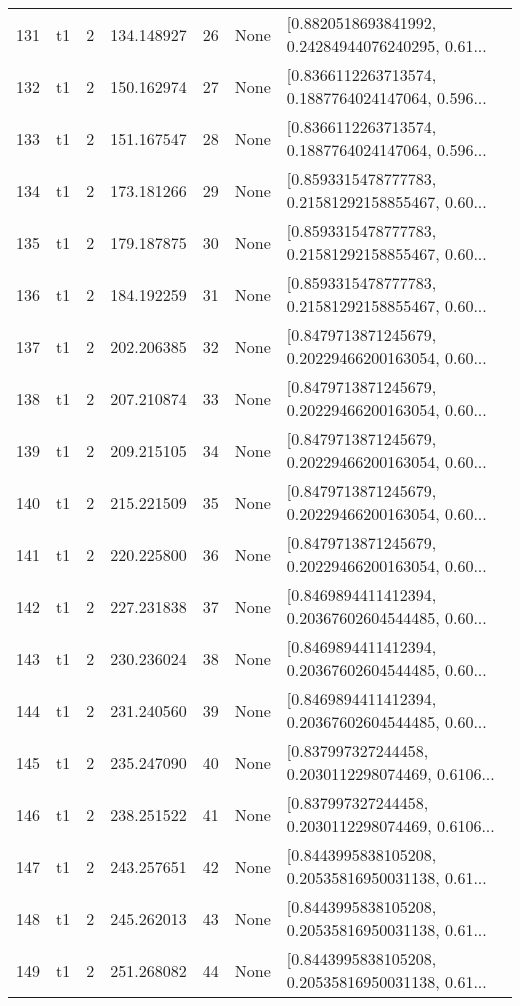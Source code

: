 \begin{tabular}{lllrlll}
131 &  t1 &   2 &  134.148927 &   26 &  None &  [0.8820518693841992, 0.24284944076240295, 0.61... \\
132 &  t1 &   2 &  150.162974 &   27 &  None &  [0.8366112263713574, 0.1887764024147064, 0.596... \\
133 &  t1 &   2 &  151.167547 &   28 &  None &  [0.8366112263713574, 0.1887764024147064, 0.596... \\
134 &  t1 &   2 &  173.181266 &   29 &  None &  [0.8593315478777783, 0.21581292158855467, 0.60... \\
135 &  t1 &   2 &  179.187875 &   30 &  None &  [0.8593315478777783, 0.21581292158855467, 0.60... \\
136 &  t1 &   2 &  184.192259 &   31 &  None &  [0.8593315478777783, 0.21581292158855467, 0.60... \\
137 &  t1 &   2 &  202.206385 &   32 &  None &  [0.8479713871245679, 0.20229466200163054, 0.60... \\
138 &  t1 &   2 &  207.210874 &   33 &  None &  [0.8479713871245679, 0.20229466200163054, 0.60... \\
139 &  t1 &   2 &  209.215105 &   34 &  None &  [0.8479713871245679, 0.20229466200163054, 0.60... \\
140 &  t1 &   2 &  215.221509 &   35 &  None &  [0.8479713871245679, 0.20229466200163054, 0.60... \\
141 &  t1 &   2 &  220.225800 &   36 &  None &  [0.8479713871245679, 0.20229466200163054, 0.60... \\
142 &  t1 &   2 &  227.231838 &   37 &  None &  [0.8469894411412394, 0.20367602604544485, 0.60... \\
143 &  t1 &   2 &  230.236024 &   38 &  None &  [0.8469894411412394, 0.20367602604544485, 0.60... \\
144 &  t1 &   2 &  231.240560 &   39 &  None &  [0.8469894411412394, 0.20367602604544485, 0.60... \\
145 &  t1 &   2 &  235.247090 &   40 &  None &  [0.837997327244458, 0.2030112298074469, 0.6106... \\
146 &  t1 &   2 &  238.251522 &   41 &  None &  [0.837997327244458, 0.2030112298074469, 0.6106... \\
147 &  t1 &   2 &  243.257651 &   42 &  None &  [0.8443995838105208, 0.20535816950031138, 0.61... \\
148 &  t1 &   2 &  245.262013 &   43 &  None &  [0.8443995838105208, 0.20535816950031138, 0.61... \\
149 &  t1 &   2 &  251.268082 &   44 &  None &  [0.8443995838105208, 0.20535816950031138, 0.61... \\

\end{tabular}
